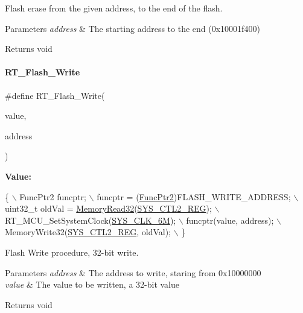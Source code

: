 Flash erase from the given address, to the end of the flash. 


\begin{DoxyParams}{Parameters}
{\em address} & The starting address to the end (0x10001f400) \\
\hline
\end{DoxyParams}
\begin{DoxyReturn}{Returns}
void 
\end{DoxyReturn}
\mbox{\label{a00008_a13fb43316f72b3b1b9467a91fca08d5c}} 
\paragraph{\texorpdfstring{R\+T\+\_\+\+Flash\+\_\+\+Write}{RT\_Flash\_Write}}
{\footnotesize\ttfamily \#define R\+T\+\_\+\+Flash\+\_\+\+Write(\begin{DoxyParamCaption}\item[{}]{value,  }\item[{}]{address }\end{DoxyParamCaption})}

{\bfseries Value\+:}
\begin{DoxyCode}
\{                                                   \(\backslash\)
        FuncPtr2 funcptr;                               \(\backslash\)
        funcptr = (\mbox{\hyperlink{a00020_a331a88eeefe11112bb8fe1b43dd777b8}{FuncPtr2}})FLASH\_WRITE\_ADDRESS;        \(\backslash\)
        uint32\_t oldVal = \mbox{\hyperlink{a00020_a2d484dc15bdf30ee11ab3b05f31f0e16}{MemoryRead32}}(\mbox{\hyperlink{a00020_ae6a98a78f9ac0c75c18c7d4e2c62fdcb}{SYS\_CTL2\_REG}});   \(\backslash\)
        RT\_MCU\_SetSystemClock(\mbox{\hyperlink{a00020_a8ddc6e06a91f5506443cdef0458729df}{SYS\_CLK\_6M}});              \(\backslash\)
        funcptr(value, address);                        \(\backslash\)
        MemoryWrite32(\mbox{\hyperlink{a00020_ae6a98a78f9ac0c75c18c7d4e2c62fdcb}{SYS\_CTL2\_REG}}, oldVal);            \(\backslash\)
    \}
\end{DoxyCode}


Flash Write procedure, 32-\/bit write. 


\begin{DoxyParams}{Parameters}
{\em address} & The address to write, staring from 0x10000000 \\
\hline
{\em value} & The value to be written, a 32-\/bit value \\
\hline
\end{DoxyParams}
\begin{DoxyReturn}{Returns}
void 
\end{DoxyReturn}
